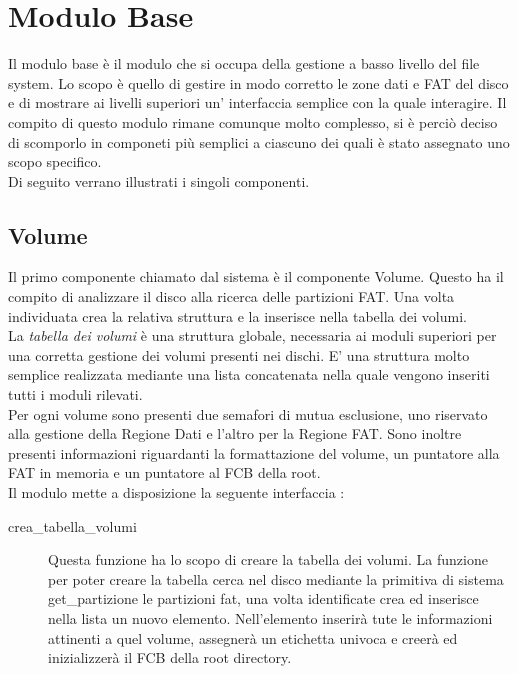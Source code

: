 \section{Modulo Base}
\label{sect:ModuloBase}
Il modulo base è il modulo che si occupa della gestione a basso livello del file system. Lo scopo è quello di gestire in modo corretto le zone dati e FAT del disco e di mostrare ai livelli superiori un'
interfaccia semplice con la quale interagire. 
Il compito di questo modulo rimane comunque molto complesso, si è perciò deciso di scomporlo in componeti più semplici a ciascuno dei quali è stato assegnato uno scopo specifico.\\
Di seguito verrano illustrati i singoli componenti. 
 
\subsection{Volume}
  Il primo componente chiamato dal sistema è il componente Volume. Questo ha il compito di analizzare il disco alla ricerca delle partizioni FAT. Una volta individuata crea la relativa struttura e la  inserisce nella tabella dei volumi. \\
  La \textit{tabella dei volumi} è una struttura globale, necessaria ai moduli superiori per una corretta gestione dei volumi presenti nei dischi. E' una struttura molto semplice realizzata mediante una lista concatenata nella quale vengono inseriti tutti i moduli rilevati. \\
  Per ogni volume sono presenti due semafori di mutua esclusione, uno riservato alla gestione della Regione Dati e l'altro per la Regione FAT.
  Sono inoltre presenti informazioni riguardanti la formattazione del volume, un puntatore alla FAT in memoria e un puntatore al FCB della root.\\

  Il modulo mette a disposizione la seguente interfaccia : \\	
    \begin{description}
     \item[crea\_tabella\_volumi]
    Questa funzione ha lo scopo di creare la tabella dei volumi.  La funzione per poter creare la tabella cerca nel disco mediante la primitiva di sistema get\_partizione le partizioni fat, una volta identificate crea  ed inserisce nella lista un nuovo elemento. Nell'elemento inserirà tute le informazioni attinenti a quel volume, assegnerà un etichetta univoca e creerà ed inizializzerà il FCB della root directory. \\
    \end{description}
    
